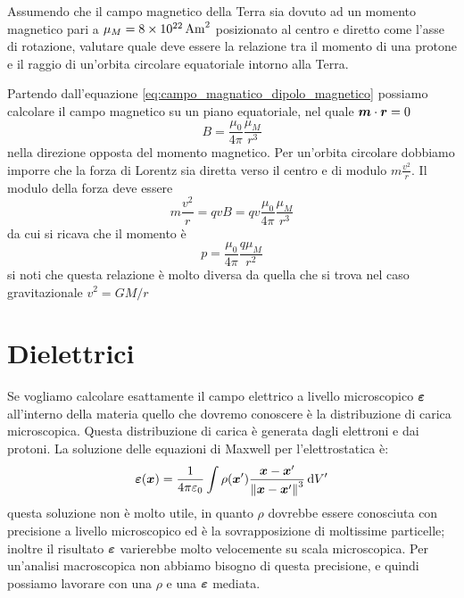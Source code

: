 \begin{Es}
  Assumendo che il campo magnetico della Terra sia dovuto ad un momento magnetico pari a $\mu_M=\SI{8E22}{\ampere\meter^2}$ posizionato al centro e diretto come l'asse di rotazione, valutare quale deve essere la relazione tra il momento di una protone e il raggio di un'orbita circolare equatoriale intorno alla Terra.

  Partendo dall'equazione \eqref{eq:campo_magnatico_dipolo_magnetico} possiamo calcolare il campo magnetico su un piano equatoriale, nel quale $\boldsymbol{m}\cdot \boldsymbol{r} = 0$
  \[
    B = \frac{\mu_0}{4\pi}\frac{\mu_M}{r^3}
  \]
  nella direzione opposta del momento magnetico. Per un'orbita circolare dobbiamo imporre che la forza di Lorentz sia diretta verso il centro e di modulo $m\frac{v^2}{r}$. Il modulo della forza deve essere
  \[
  m\frac{v^2}{r} = q v B = qv \frac{\mu_0}{4\pi}\frac{\mu_M}{r^3}
  \]
  da cui si ricava che il momento è
  \[
  p = \frac{\mu_0}{4\pi}\frac{q\mu_M}{r^2}
  \]
si noti che questa relazione è molto diversa da quella che si trova nel caso gravitazionale $v^2  = G M  / r$

 

\end{Es}

\chapter{Dielettrici}
\minitoc
Se vogliamo calcolare esattamente il campo elettrico a livello microscopico $\boldsymbol{\varepsilon}$ all'interno della materia quello che dovremo conoscere è la distribuzione di carica microscopica. Questa distribuzione di carica è generata dagli elettroni e dai protoni. La soluzione delle equazioni di Maxwell per l'elettrostatica è:
\begin{equation}
  \boldsymbol{\varepsilon}(\boldsymbol{x}) = \frac{1}{4\pi\varepsilon_0}\int \rho(\boldsymbol{x}')\frac{\boldsymbol{x} -\boldsymbol{x}'}{\left\lVert\boldsymbol{x}-\boldsymbol{x}'\right\rVert^3}\,\mathrm{d} V'
\end{equation}
questa soluzione non è molto utile, in quanto $\rho$ dovrebbe essere conosciuta con precisione a livello microscopico ed è la sovrapposizione di moltissime particelle; inoltre il risultato $\boldsymbol{\varepsilon}$ varierebbe molto velocemente su scala microscopica. Per un'analisi macroscopica non abbiamo bisogno di questa precisione, e quindi possiamo lavorare con una $\rho$ e una $\boldsymbol{\varepsilon}$ mediata.

